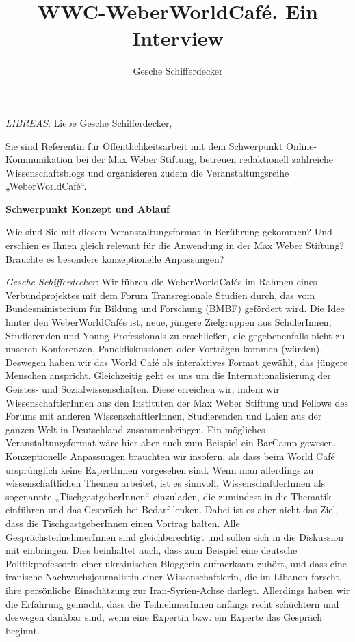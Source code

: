 \documentclass[a4paper,
fontsize=11pt,
oneside,
numbers=noperiodatend,
parskip=half-,
bibliography=totoc,
final
]{scrartcl}
\title{\LARGE{WWC-WeberWorldCafé. Ein Interview}} %
\author{Gesche Schifferdecker} %
\date{}
\begin{document}
\maketitle
\thispagestyle{fancyplain} 


\emph{LIBREAS}: Liebe Gesche Schifferdecker,

Sie sind Referentin für Öffentlichkeitsarbeit mit dem Schwerpunkt
Online-Kommunikation bei der Max Weber Stiftung, betreuen redaktionell
zahlreiche Wissenschaftsblogs und organisieren zudem die
Veranstaltungsreihe „WeberWorldCafé``.

\textbf{Schwerpunkt Konzept und Ablauf}

Wie sind Sie mit diesem Veranstaltungsformat in Berührung gekommen? Und
erschien es Ihnen gleich relevant für die Anwendung in der Max Weber
Stiftung? Brauchte es besondere konzeptionelle Anpassungen?

\emph{Gesche Schifferdecker}: Wir führen die WeberWorldCafés im Rahmen
eines Verbundprojektes mit dem Forum Transregionale Studien durch, das
vom Bundesministerium für Bildung und Forschung (BMBF) gefördert wird.
Die Idee hinter den WeberWorldCafés ist, neue, jüngere Zielgruppen aus
SchülerInnen, Studierenden und Young Professionals zu erschließen, die
gegebenenfalls nicht zu unseren Konferenzen, Paneldiskussionen oder
Vorträgen kommen (würden). Deswegen haben wir das World Café als
interaktives Format gewählt, das jüngere Menschen anspricht.
Gleichzeitig geht es uns um die Internationalisierung der Geistes- und
Sozialwissenschaften. Diese erreichen wir, indem wir
WissenschaftlerInnen aus den Instituten der Max Weber Stiftung und
Fellows des Forums mit anderen WissenschaftlerInnen, Studierenden und
Laien aus der ganzen Welt in Deutschland zusammenbringen. Ein mögliches
Veranstaltungsformat wäre hier aber auch zum Beispiel ein BarCamp
gewesen. Konzeptionelle Anpassungen brauchten wir insofern, als dass
beim World Café ursprünglich keine ExpertInnen vorgesehen sind. Wenn man
allerdings zu wissenschaftlichen Themen arbeitet, ist es sinnvoll,
WissenschaftlerInnen als sogenannte „TischgastgeberInnen`` einzuladen,
die zumindest in die Thematik einführen und das Gespräch bei Bedarf
lenken. Dabei ist es aber nicht das Ziel, dass die TischgastgeberInnen
einen Vortrag halten. Alle GesprächsteilnehmerInnen sind
gleichberechtigt und sollen sich in die Diskussion mit einbringen. Dies
beinhaltet auch, dass zum Beispiel eine deutsche Politikprofessorin
einer ukrainischen Bloggerin aufmerksam zuhört, und dass eine iranische
Nachwuchsjournalistin einer Wissenschaftlerin, die im Libanon forscht,
ihre persönliche Einschätzung zur Iran-Syrien-Achse darlegt. Allerdings
haben wir die Erfahrung gemacht, dass die TeilnehmerInnen anfangs recht
schüchtern und deswegen dankbar sind, wenn eine Expertin bzw. ein
Experte das Gespräch beginnt.
\end{document}
